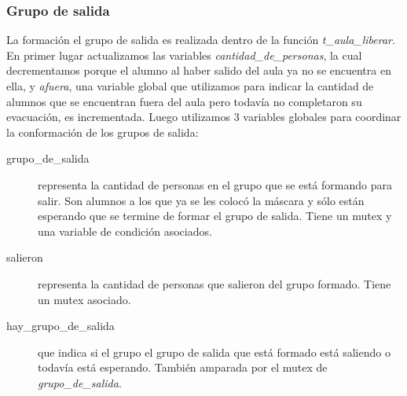 \subsubsection{Grupo de salida}
La formación el grupo de salida es realizada dentro de la función \textit{t\_aula\_liberar}.
En primer lugar actualizamos las variables \textit{cantidad\_de\_personas}, la cual
decrementamos porque el alumno al haber salido del aula ya no se encuentra en ella, y 
\textit{afuera}, una variable global que utilizamos para indicar la cantidad de alumnos 
que se encuentran fuera del aula pero todavía no completaron su evacuación, es incrementada.
Luego utilizamos 3 variables globales para coordinar la conformación de los grupos de salida:
\begin{description}
  \item[grupo\_de\_salida] representa la cantidad de personas en el grupo que se está formando
  para salir. Son alumnos a los que ya se les colocó la máscara y sólo están esperando
  que se termine de formar el grupo de salida. Tiene un mutex y una variable de condición
  asociados.
  \item[salieron] representa la cantidad de personas que salieron del grupo formado. Tiene
    un mutex asociado.
  \item[hay\_grupo\_de\_salida] que indica si el grupo el grupo de salida que 
    está formado está saliendo o todavía está esperando. También amparada por el 
    mutex de \textit{grupo\_de\_salida}.
\end{description}

